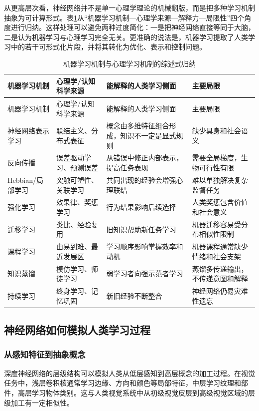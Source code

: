 \documentclass[UTF8,zihao=-4,a4paper]{ctexart}
\begin{document}
从更高层次看，神经网络并不是单一心理学理论的机械翻版，而是把多种学习机制抽象为可计算形式。表\ref{tab:learning_mechanism_summary}从“机器学习机制—心理学来源—解释力—局限性”四个角度进行归纳。这样处理可以避免两种过度简化：一是把神经网络直接等同于大脑，二是认为机器学习与心理学习完全无关。更准确的说法是，机器学习提取了人类学习中的若干可形式化片段，并将其转化为优化、表示和控制问题。

\begin{longtable}{p{3.0cm}p{3.4cm}p{4.2cm}p{3.4cm}}
\caption{机器学习机制与心理学习机制的综述式归纳}
\label{tab:learning_mechanism_summary}\\
\toprule
机器学习机制 & 心理学/认知科学来源 & 能解释的人类学习侧面 & 主要局限 \\
\midrule
\endfirsthead
\toprule
机器学习机制 & 心理学/认知科学来源 & 能解释的人类学习侧面 & 主要局限 \\
\midrule
\endhead
神经网络表示学习 & 联结主义、分布式表征 & 概念由多维特征组合形成，知识不一定是显式规则 & 缺少具身和社会语义 \\
反向传播 & 误差驱动学习、预测误差 & 从错误中修正内部表示，提高任务表现 & 需要全局梯度，生物可行性有限 \\
Hebbian/局部学习 & 突触可塑性、关联学习 & 共同出现的经验会增强心理联结 & 难以单独解决复杂监督任务 \\
强化学习 & 效果律、奖惩学习 & 行为结果影响后续选择 & 人类奖惩包含价值和社会意义 \\
迁移学习 & 类比、经验复用 & 旧知识帮助新任务学习 & 机器迁移容易受分布相似性限制 \\
课程学习 & 由易到难、最近发展区 & 学习顺序影响掌握效率和动机 & 机器课程通常缺少情绪和社会支架 \\
知识蒸馏 & 模仿学习、师徒学习 & 弱学习者向强示范者学习 & 蒸馏多传递输出，不传递意图和解释 \\
持续学习 & 终身学习、记忆巩固 & 新旧经验不断整合 & 神经网络仍易灾难性遗忘 \\
\bottomrule
\end{longtable}

\subsection{神经网络如何模拟人类学习过程}

\subsubsection{从感知特征到抽象概念}

深度神经网络的层级结构可以模拟人类从低层感知到高层概念的加工过程。在视觉任务中，浅层卷积核通常学习边缘、方向和颜色等局部特征，中层学习纹理和部件，高层学习物体类别。这与人类视觉系统中从初级视觉皮层到高级视觉区域的层级加工有一定相似性。
\end{document}
